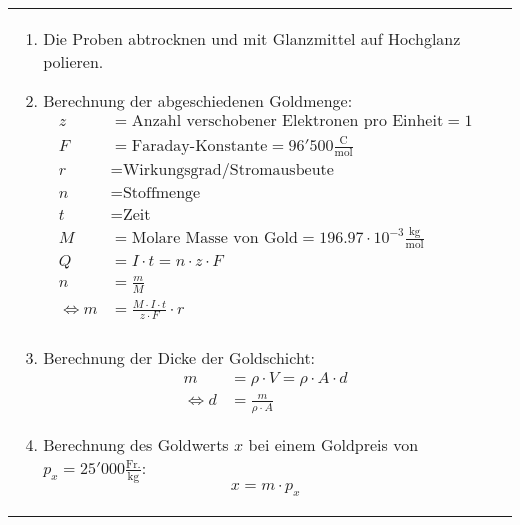 \begin{longtable}{p{3cm}p{14cm}}
\begin{enumerate}
			\item Die Proben abtrocknen und mit Glanzmittel auf Hochglanz polieren.
			
			\item Berechnung der abgeschiedenen Goldmenge:
			$$ \boxed{
				\begin{aligned}
					z &= \text{Anzahl verschobener Elektronen pro Einheit} = 1\\
					F &= \text{Faraday-Konstante} = 96'500 \frac{\mathrm{C}}{\mathrm{mol}}\\
					r &= \text{Wirkungsgrad/Stromausbeute}\\
					n &= \text{Stoffmenge}\\
					t &= \text{Zeit}\\
					M &= \text{Molare Masse von Gold} = 196.97 \cdot 10^{-3} \frac{\mathrm{kg}}{\mathrm{mol}}\\
					Q &= I \cdot t = n\cdot z \cdot F\\
					n &= \frac{m}{M}\\
					\Longleftrightarrow m &= \frac{M \cdot I \cdot t}{z\cdot F} \cdot r\\
				\end{aligned}}$$
														
			\item Berechnung der Dicke der Goldschicht:
			$$ \boxed{
				\begin{aligned}
					m 	&= \rho \cdot V = \rho \cdot A \cdot d\\
					\Longleftrightarrow d	&= \frac{m}{\rho \cdot A}
				\end{aligned}}$$
			\item Berechnung des Goldwerts $x$ bei einem Goldpreis von $p_x = 25'000 \frac{\mathrm{Fr.}}{\mathrm{kg}}$: $$\boxed{x = m \cdot  p_x}$$
		\end{enumerate}
\end{longtable}

\newpage